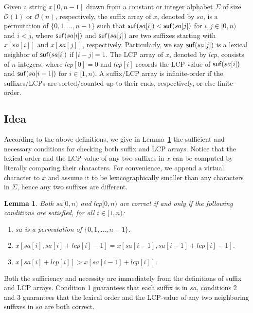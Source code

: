 \documentclass[10pt,journal,compsoc]{IEEEtran}
\newtheorem{Lemma}{Lemma}
\begin{document}
Given a string $x[0, n-1]$ drawn from a constant or integer alphabet $\Sigma$ of size $\mathcal{O}(1)$ or $\mathcal{O}(n)$, respectively, the suffix array of $x$, denoted by $sa$, is a permutation of $\{0, 1, ..., n - 1\}$ such that ${\sf suf}(sa[i]) < {\sf suf}(sa[j])$ for $i, j \in [0, n)$ and $i < j$, where ${\sf suf}(sa[i])$ and ${\sf suf}(sa[j])$ are two suffixes starting with $x[sa[i]]$ and $x[sa[j]]$, respectively. Particularly, we say ${\sf suf}(sa[j])$ is a lexical neighbor of ${\sf suf}(sa[i])$ if $|i - j| = 1$. The LCP array of $x$, denoted by $lcp$, consists of $n$ integers, where $lcp[0]=0$ and $lcp[i]$ records the LCP-value of ${\sf suf}(sa[i])$ and ${\sf suf}(sa[i - 1])$ for $i \in [1, n)$. A suffix/LCP array is infinite-order if the suffixes/LCPs are sorted/counted up to their ends, respectively, or else finite-order.

\subsection{Idea} \label{sec:method1:idea}

According to the above definitions, we give in Lemma~\ref{lemma:1} the sufficient and necessary conditions for checking both suffix and LCP arrays. Notice that the lexical order and the LCP-value of any two suffixes in $x$ can be computed by literally comparing their characters. For convenience, we append a virtual character to $x$ and assume it to be lexicographically smaller than any characters in $\Sigma$, hence any two suffixes are different.


\begin{Lemma} \label{lemma:1}
	Both $sa[0, n)$ and $lcp[0, n)$ are correct if and only if the following conditions are satisfied, for all $i \in [1, n)$:
	\begin{enumerate}[(1)]
		\item
		$sa$ is a permutation of $\{0, 1, \dots, n - 1\}$.
		\item
		$x[sa[i], sa[i] + lcp[i] - 1] = x[sa[i - 1], sa[i - 1] + lcp[i] - 1]$.
		\item
		$x[sa[i] + lcp[i]] > x[sa[i - 1] + lcp[i]]$. 	
	\end{enumerate}
\end{Lemma}

\begin{IEEEproof}
	Both the sufficiency and necessity are immediately from the definitions of suffix and LCP arrays. Condition 1 guarantees that each suffix is in $sa$, conditions 2 and 3 guarantees that the lexical order and the LCP-value of any two neighboring suffixes in $sa$ are both correct.
\end{IEEEproof}
\end{document}
